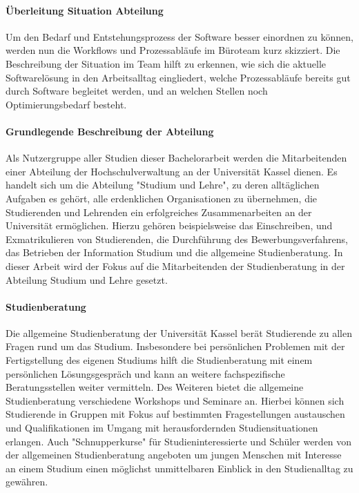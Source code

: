 \documentclass[12pt]{article}
\begin{document}
\paragraph{Überleitung Situation Abteilung}
Um den Bedarf und Entstehungsprozess der Software besser einordnen zu können,
werden nun die Workflows und Prozessabläufe im Büroteam kurz skizziert. Die
Beschreibung der Situation im Team hilft zu erkennen, wie sich die aktuelle
Softwarelösung in den Arbeitsalltag eingliedert, welche Prozessabläufe bereits
gut durch Software begleitet werden, und an welchen Stellen noch
Optimierungsbedarf besteht.

\paragraph{Grundlegende Beschreibung der Abteilung}
Als Nutzergruppe aller Studien dieser Bachelorarbeit werden die Mitarbeitenden
einer Abteilung der Hochschulverwaltung an der Universität Kassel dienen. Es
handelt sich um die Abteilung "Studium und Lehre", zu deren alltäglichen
Aufgaben es gehört, alle erdenklichen Organisationen zu übernehmen, die
Studierenden und Lehrenden ein erfolgreiches Zusammenarbeiten an der
Universität ermöglichen. Hierzu gehören beispielsweise das Einschreiben, und
Exmatrikulieren von Studierenden, die Durchführung des Bewerbungsverfahrens,
das Betrieben der Information Studium und die allgemeine Studienberatung. In
dieser Arbeit wird der Fokus auf die Mitarbeitenden der Studienberatung in der
Abteilung Studium und Lehre gesetzt.

\paragraph{Studienberatung}
Die allgemeine Studienberatung der Universität Kassel berät Studierende zu
allen Fragen rund um das Studium. Insbesondere bei persönlichen Problemen mit
der Fertigstellung des eigenen Studiums hilft die Studienberatung mit einem
persönlichen Lösungsgespräch und kann an weitere fachspezifische
Beratungsstellen weiter vermitteln. Des Weiteren bietet die allgemeine
Studienberatung verschiedene Workshops und Seminare an. Hierbei können sich
Studierende in Gruppen mit Fokus auf bestimmten Fragestellungen austauschen und
Qualifikationen im Umgang mit herausfordernden Studiensituationen erlangen.
Auch "Schnupperkurse" für Studieninteressierte und Schüler werden von der
allgemeinen Studienberatung angeboten um jungen Menschen mit Interesse an einem
Studium einen möglichst unmittelbaren Einblick in den Studienalltag zu
gewähren.\cite{studBeratungKsWeb}
\end{document}
